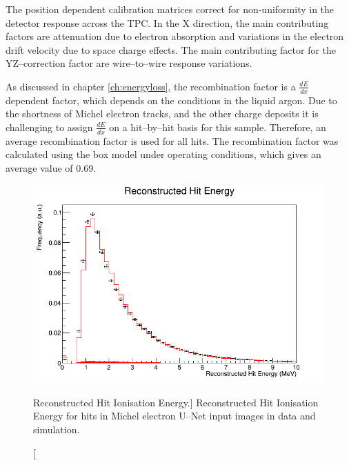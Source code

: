 The position dependent calibration matrices correct for non-uniformity in the
detector response across the TPC. In the X direction, the main contributing
factors are attenuation due to electron absorption and variations in the
electron drift velocity due to space charge effects. The main contributing
factor for the YZ--correction factor are wire--to--wire response variations.

As discussed in chapter \ref{ch:energyloss}, the recombination factor is a
$\frac{dE}{dx}$ dependent factor, which depends on the conditions in the liquid
argon. Due to the shortness of Michel electron tracks, and the other charge 
deposits it is challenging to assign $\frac{dE}{dx}$ on a hit--by--hit 
basis for this sample. Therefore, an average recombination factor is used for 
all hits. The recombination factor was calculated using the box model 
\cite{Acciarri2013a} under \protodune{} operating conditions, which gives an
average value of 0.69.

\begin{figure}
	\centering
	\includegraphics[width=\textwidth]{figures/hit_ion_reco.png}
	\caption
	[Reconstructed Hit Ionisation Energy.]
	{Reconstructed Hit Ionisation Energy for hits in Michel electron U--Net input 
	images in data and simulation.}
	\label{fig:hit_ion_reco}
\end{figure}

